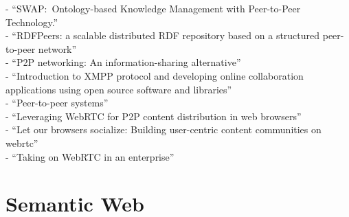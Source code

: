 - ``SWAP:\ Ontology-based Knowledge Management with Peer-to-Peer Technology.'' \citep{ehrig2003swap} \\
- ``RDFPeers: a scalable distributed RDF repository based on a structured peer-to-peer network'' \citep{cai2004rdfpeers} \\
- ``P2P networking: An information-sharing alternative'' \citep{parameswaran2001p2p} \\
- ``Introduction to XMPP protocol and developing online collaboration applications using open source software and libraries'' \citep{ozturk2010introduction} \\
- ``Peer-to-peer systems'' \citep{rodrigues2010peer} \\
- ``Leveraging WebRTC for P2P content distribution in web browsers'' \citep{vogt2013leveraging} \\
- ``Let our browsers socialize: Building user-centric content communities on webrtc'' \citep{werner2014let} \\
- ``Taking on WebRTC in an enterprise'' \citep{vogt2013leveraging}


\section{Semantic Web}
\label{sec:related_semweb}

